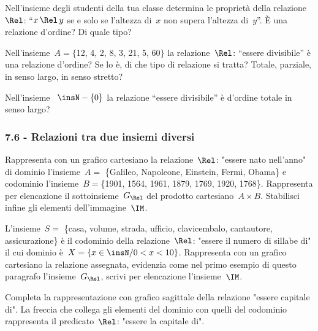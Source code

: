 \begin{multicols}{2}
\begin{esercizio}
\label{ese:7.41}
Nell'insieme degli studenti della tua classe determina le proprietà della relazione~$\Rel$: ``$x \,\Rel\, y$ se e solo se l'altezza di~$x$ non supera l'altezza di~$y$''. \`E una relazione d'ordine? Di quale tipo?
\end{esercizio}

\begin{esercizio}
\label{ese:7.42}
Nell'insieme~$A = \{$12, 4, 2, 8, 3, 21, 5, 60$\}$ la relazione~$\Rel$: ``essere divisibile'' è una relazione d'ordine? Se lo è, di che tipo di relazione si tratta? Totale, parziale, in senso largo, in senso stretto?
\end{esercizio}

\begin{esercizio}
\label{ese:7.43}
Nell'insieme ~$\insN - \{ 0 \}$ la relazione ``essere divisibile'' è d'ordine totale in senso largo?
\end{esercizio}

\subsubsection*{7.6 - Relazioni tra due insiemi diversi}
\begin{esercizio}
\label{ese:7.44}
Rappresenta con un grafico cartesiano la relazione~$\Rel$: "essere nato nell'anno" di dominio l'insieme~$A=$ \{Galileo, Napoleone, Einstein, Fermi, Obama\}
e codominio l'insieme~$B=$\{1901, 1564, 1961, 1879, 1769, 1920, 1768\}. Rappresenta per elencazione il sottoinsieme~$G_\Rel$ del prodotto cartesiano~$A \times B$.
Stabilisci infine gli elementi dell'immagine~$\IM$.
\end{esercizio}

\begin{esercizio}
\label{ese:7.45}
L'insieme~$S=$ \{casa, volume, strada, ufficio, clavicembalo, cantautore, assicurazione\} è il codominio della relazione~$\Rel$: "essere il numero di sillabe di" il cui dominio
è~$X=\{x \in\insN / 0<x<10\}$. Rappresenta con un grafico cartesiano la relazione assegnata, evidenzia come nel primo esempio di questo paragrafo l'insieme~$G_\Rel$,
scrivi per elencazione l'insieme~$\IM$.
\end{esercizio}

\begin{esercizio}
\label{ese:7.46}
Completa la rappresentazione con grafico sagittale della relazione "essere capitale di". La freccia che collega gli elementi del dominio con quelli del codominio rappresenta
il predicato~$\Rel$: "essere la capitale di".
\begin{center}
 
\end{center}
\end{esercizio}


\end{multicols}
